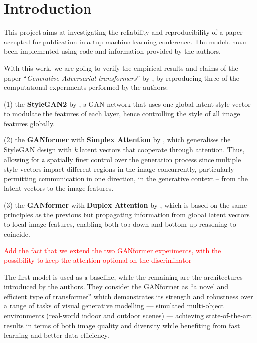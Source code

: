 \documentclass{article}
\begin{document}
	
	\section{Introduction}
	This project aims at investigating the reliability and reproducibility of a paper accepted 
	for publication in a top machine learning conference. The models have been implemented 
	using code and information provided by the authors.
	
	With this work, we are going to verify the empirical results and claims of the paper 
	``\emph{Generative Adversarial transformers}'' by \citet{hudson2021generative}, by reproducing 
	three of the computational experiments performed by the authors:
	\begin{enumerate*}
		\item[(1)] the \textbf{StyleGAN2} by \citet{karras2020analyzing,karras2019style}, a GAN 
		network that uses one global latent style vector to modulate the features of each layer, hence 
		controlling the style of all image features globally.
		\item[(2)] the \textbf{GANformer} with \textbf{Simplex Attention} by 
		\citet{hudson2021generative}, which generalises the StyleGAN design with \textit{k} latent 
		vectors that cooperate through attention. Thus, allowing for a spatially finer control over the 
		generation 
		process since multiple style vectors impact different regions in the image concurrently, 
		particularly 
		permitting communication in one direction, in the generative context – from the latent vectors to 
		the 
		image features.
		\item[(3)] the \textbf{GANformer} with \textbf{Duplex Attention} by \citet{hudson2021generative}, 
		which is based on the same principles as the previous but propagating information from 
		global latent vectors to local image features, enabling both top-down and bottom-up reasoning to 
		coincide.
	\end{enumerate*} 
	
	\textcolor{red}{Add the fact that we extend the two GANformer experiments, with the possibility to 
		keep the attention optional on the discriminator}
	
	The first model is used as a baseline, while the remaining are the architectures introduced by the 
	authors. 
	They consider the GANformer as “a novel and efficient type of transformer” which demonstrates its 
	strength 
	and robustness over a range of tasks of visual generative modelling — simulated multi-object 
	environments 
	(real-world indoor and outdoor scenes) — achieving state-of-the-art results in terms of both image 
	quality 
	and diversity while benefiting from fast learning and better data-efficiency.
	
\end{document}
